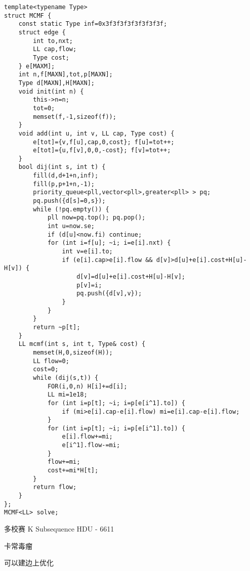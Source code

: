 \begin{lstlisting}
template<typename Type>
struct MCMF {
    const static Type inf=0x3f3f3f3f3f3f3f3f;
    struct edge {
        int to,nxt;
        LL cap,flow;
        Type cost;
    } e[MAXM];
    int n,f[MAXN],tot,p[MAXN];
    Type d[MAXN],H[MAXN];
    void init(int n) {
        this->n=n;
        tot=0;
        memset(f,-1,sizeof(f));
    }
    void add(int u, int v, LL cap, Type cost) {
        e[tot]={v,f[u],cap,0,cost}; f[u]=tot++;
        e[tot]={u,f[v],0,0,-cost}; f[v]=tot++;
    }
    bool dij(int s, int t) {
        fill(d,d+1+n,inf);
        fill(p,p+1+n,-1);
        priority_queue<pll,vector<pll>,greater<pll> > pq;
        pq.push({d[s]=0,s});
        while (!pq.empty()) {
            pll now=pq.top(); pq.pop();
            int u=now.se;
            if (d[u]<now.fi) continue;
            for (int i=f[u]; ~i; i=e[i].nxt) {
                int v=e[i].to;
                if (e[i].cap>e[i].flow && d[v]>d[u]+e[i].cost+H[u]-H[v]) {
                    d[v]=d[u]+e[i].cost+H[u]-H[v];
                    p[v]=i;
                    pq.push({d[v],v});
                }
            }
        }
        return ~p[t];
    }
    LL mcmf(int s, int t, Type& cost) {
        memset(H,0,sizeof(H));
        LL flow=0;
        cost=0;
        while (dij(s,t)) {
            FOR(i,0,n) H[i]+=d[i];
            LL mi=1e18;
            for (int i=p[t]; ~i; i=p[e[i^1].to]) {
                if (mi>e[i].cap-e[i].flow) mi=e[i].cap-e[i].flow;
            }
            for (int i=p[t]; ~i; i=p[e[i^1].to]) {
                e[i].flow+=mi;
                e[i^1].flow-=mi;
            }
            flow+=mi;
            cost+=mi*H[t];
        }
        return flow;
    }
};
MCMF<LL> solve;
\end{lstlisting}

多校赛 K Subsequence HDU - 6611

卡常毒瘤

可以建边上优化

